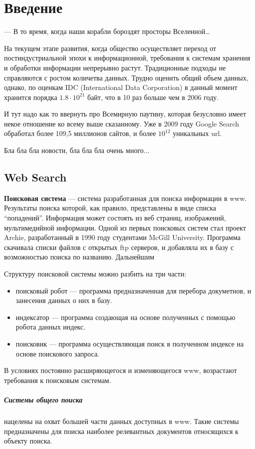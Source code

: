 \chapter{Введение} 
\epigraph{— В то время, когда наши корабли бороздят просторы
Вселенной…}{} На текущем этапе развития, когда общество осуществляет переход от
постиндустриальной эпохи к информационной, требования к системам хранения и
обработки информации непрерывно растут. Традиционные подходы не справляются с
ростом количетва данных. Трудно оценить общий объем данных, однако, по оценкам
IDC (International Data Corporation) в данный момент хранится порядка
$1.8\cdot10^{21}$ байт, что в 10 раз больше чем в 2006 году.

И тут надо как то ввернуть про Всемирную паутину, которая безусловно имеет некое
отношение ко всему выше сказанному. Уже в 2009 году Google Search обработал
более 109,5 миллионов сайтов, и более $10^{12}$ уникальных url.

Бла бла бла новости, бла бла бла очень много...

\section{Web Search} 
\textbf{Поисковая система} --- система разработанная для
поиска информации в www. Результаты поиска которой, как правило, представлены в
виде списка ``попадений''. Информация может состоять из веб страниц,  изображений,
мультимедийной информации. Одной из первых поисковых систем стал
проект Archie, разработанный в 1990 году студентами McGill University. Программа скачивала
списки файлов с открытых ftp серверов, и добавляла их в базу с возможностью
поиска по названию. Дальнейшим 

Структуру поисковой системы можно разбить на три части: \begin{itemize} \item
поисковый робот --- программа предназначенная для перебора докуметнов, и
занесения данных о них в базу. \item индексатор --- программа создающая на
основе полученных с помощью робота данных индекс. \item поисковик --- программа
осуществляющая поиск в полученном индексе на основе поискового запроса.
\end{itemize} В условиях постоянно расширяющегося и изменяющегося www,
возрастают требования к поисковым системам. 

\paragraph{Системы общего поиска} нацелены на охват большей части данных
доступных в www. Такие системы предназначены для поиска наиболее релевантных
документов относящихся к объекту поиска. 
